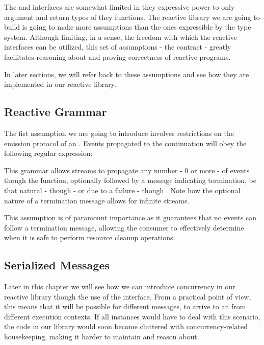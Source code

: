 The  and  interfaces are somewhat limited in they expressive power to only argument and return types of they functions. The reactive library we are going to build is going to make more assumptions than the ones expressible by the type system. Although limiting, in a sense, the freedom with which the reactive interfaces can be utilized, this set of assumptions - the contract - greatly facilitates reasoning about and proving correctness of reactive programs\cite{MS2010-RxDesign}.

In later sections, we will refer back to these assumptions and see how they are implemented in our reactive library.

\subsection{Reactive Grammar}
\label{ass-grammar}
The fist assumption we are going to introduce involves restrictions on the emission protocol of an . Events propagated to the  continuation will obey the following regular expression:

\begin{center}\end{center}

This grammar allows streams to propagate any number - 0 or more - of events though the  function, optionally followed by a message indicating termination, be that natural - though  - or due to a failure - though . Note how the optional nature of a termination message allows for infinite streams. 

This assumption is of paramount importance as it guarantees that no events can follow a termination message, allowing the consumer to effectively determine when it is safe to perform resource cleanup operations. 

\subsection{Serialized Messages}
\label{ass-serialized}
Later in this chapter we will see how we can introduce concurrency in our reactive library though the use of the  interface. From a practical point of view, this means that it will be possible for different messages, to arrive to an  from different execution contexts. If all  instances would have to deal with this scenario, the code in our library would soon become cluttered with concurrency-related housekeeping, making it harder to maintain and reason about.

